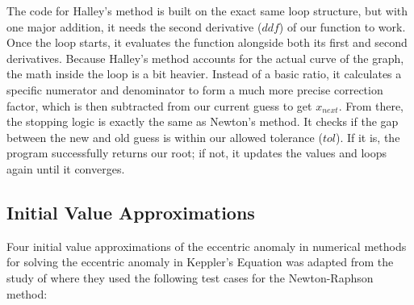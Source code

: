 \documentclass[a4paper,11pt]{article}
\begin{document}
The code for Halley's method is built on the exact same loop structure, but with one major addition, it needs the second derivative ($ddf$) of our function to work. Once the loop starts, it evaluates the function alongside both its first and second derivatives. Because Halley's method accounts for the actual curve of the graph, the math inside the loop is a bit heavier. Instead of a basic ratio, it calculates a specific numerator and denominator to form a much more precise correction factor, which is then subtracted from our current guess to get $x_{next}$. From there, the stopping logic is exactly the same as Newton's method. It checks if the gap between the new and old guess is within our allowed tolerance ($tol$). If it is, the program successfully returns our root; if not, it updates the values and loops again until it converges.


\subsection{Initial Value Approximations}

Four initial value approximations of the eccentric anomaly in numerical methods for solving the eccentric anomaly in Keppler's Equation was adapted from the study of \textcite{ozuomba2014comparative} where they used the following test cases for the Newton-Raphson method:
\end{document}
